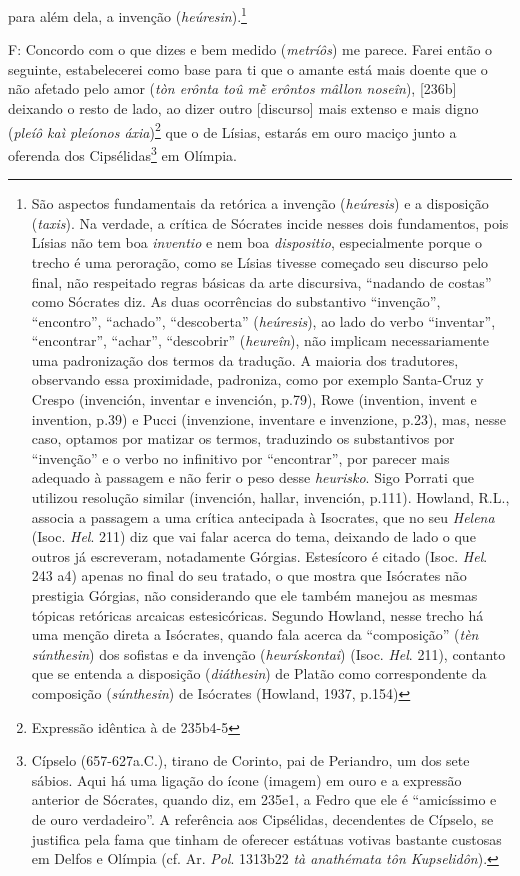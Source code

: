 para além dela, a invenção (\emph{heúresin}).\footnote{São aspectos
  fundamentais da retórica a invenção (\emph{heúresis}) e a disposição
  (\emph{taxis}). Na verdade, a crítica de Sócrates incide nesses dois
  fundamentos, pois Lísias não tem boa \emph{inventio} e nem boa
  \emph{dispositio}, especialmente porque o trecho é uma peroração, como
  se Lísias tivesse começado seu discurso pelo final, não respeitado
  regras básicas da arte discursiva, ``nadando de costas'' como Sócrates
  diz. As duas ocorrências do substantivo ``invenção'', ``encontro'',
  ``achado'', ``descoberta'' (\emph{heúresis}), ao lado do verbo
  ``inventar'', ``encontrar'', ``achar'', ``descobrir''
  (\emph{heureîn}), não implicam necessariamente uma padronização dos
  termos da tradução. A maioria dos tradutores, observando essa
  proximidade, padroniza, como por exemplo Santa-Cruz y Crespo
  (invención, inventar e invención, p.79), Rowe (invention, invent e
  invention, p.39) e Pucci (invenzione, inventare e invenzione, p.23),
  mas, nesse caso, optamos por matizar os termos, traduzindo os
  substantivos por ``invenção'' e o verbo no infinitivo por
  ``encontrar'', por parecer mais adequado à passagem e não ferir o peso
  desse \emph{heurisko}. Sigo Porrati que utilizou resolução similar
  (invención, hallar, invención, p.111). Howland, R.L., associa a
  passagem a uma crítica antecipada à Isocrates, que no seu
  \emph{Helena} (Isoc. \emph{Hel}. 211) diz que vai falar acerca do
  tema, deixando de lado o que outros já escreveram, notadamente
  Górgias. Estesícoro é citado (Isoc. \emph{Hel}. 243 a4) apenas no
  final do seu tratado, o que mostra que Isócrates não prestigia
  Górgias, não considerando que ele também manejou as mesmas tópicas
  retóricas arcaicas estesicóricas. Segundo Howland, nesse trecho há uma
  menção direta a Isócrates, quando fala acerca da ``composição''
  (\emph{tèn súnthesin}) dos sofistas e da invenção
  (\emph{heurískontai}) (Isoc. \emph{Hel}. 211), contanto que se entenda
  a disposição (\emph{diáthesin}) de Platão como correspondente da
  composição (\emph{súnthesin}) de Isócrates (Howland, 1937, p.154)}

F: Concordo com o que dizes e bem medido (\emph{metríôs}) me parece.
Farei então o seguinte, estabelecerei como base para ti que o amante
está mais doente que o não afetado pelo amor (\emph{tòn erônta toû mḕ
erôntos mâllon noseîn}), {[}236b{]} deixando o resto de lado, ao dizer
outro {[}discurso{]} mais extenso e mais digno (\emph{pleíô kaì pleíonos
áxia})\footnote{Expressão idêntica à de 235b4-5} que o de Lísias,
estarás em ouro maciço junto a oferenda dos Cipsélidas\footnote{Cípselo
  (657-627a.C.), tirano de Corinto, pai de Periandro, um dos sete
  sábios. Aqui há uma ligação do ícone (imagem) em ouro e a expressão
  anterior de Sócrates, quando diz, em 235e1, a Fedro que ele é
  ``amicíssimo e de ouro verdadeiro''. A referência aos Cipsélidas,
  decendentes de Cípselo, se justifica pela fama que tinham de oferecer
  estátuas votivas bastante custosas em Delfos e Olímpia (cf. Ar.
  \emph{Pol}. 1313b22 \emph{tà anathémata tôn Kupselidôn}).} em Olímpia.


